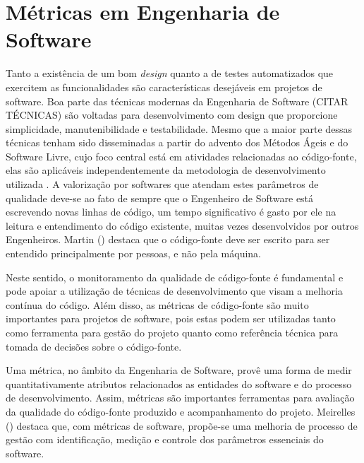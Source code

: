 %


%


\section{Métricas em Engenharia de Software}
\label{sec-metrics-esw} 
Tanto a existência de um bom \emph{design} quanto a de testes automatizados que exercitem as funcionalidades são características desejáveis em projetos de software. Boa parte das técnicas modernas da Engenharia de Software (CITAR TÉCNICAS) são voltadas para desenvolvimento com design que proporcione simplicidade, manutenibilidade e testabilidade. Mesmo que a maior parte dessas técnicas tenham sido disseminadas a partir do advento dos Métodos Ágeis e do Software Livre, cujo foco central está em atividades relacionadas ao código-fonte, elas são aplicáveis independentemente da metodologia de desenvolvimento utilizada \cite{meirelles2013metrics}. A valorização por softwares que atendam estes parâmetros de qualidade deve-se ao fato de sempre que o Engenheiro de Software está escrevendo novas linhas de código, um tempo significativo é gasto por ele na leitura e entendimento do código existente, muitas vezes desenvolvidos por outros Engenheiros. Martin (\citeyear{martin2008}) destaca que o código-fonte deve ser escrito para ser entendido principalmente por pessoas, e não pela máquina.

%

Neste sentido, o monitoramento da qualidade de código-fonte é fundamental e pode apoiar a utilização de técnicas de desenvolvimento que visam a melhoria contínua do código. Além disso, as métricas de código-fonte são muito importantes para projetos de software, pois estas podem ser utilizadas tanto como ferramenta para gestão do projeto quanto como referência técnica para tomada de decisões sobre o código-fonte.

%

Uma métrica, no âmbito da Engenharia de Software, provê uma forma de medir quantitativamente atributos relacionados as entidades do software e do processo de desenvolvimento. Assim, métricas são importantes ferramentas para avaliação da qualidade do código-fonte produzido e acompanhamento do projeto. Meirelles (\citeyear{meirelles2013metrics}) destaca que, com métricas de software, propõe-se uma melhoria de processo de gestão com identificação, medição e controle dos parâmetros essenciais do software.

